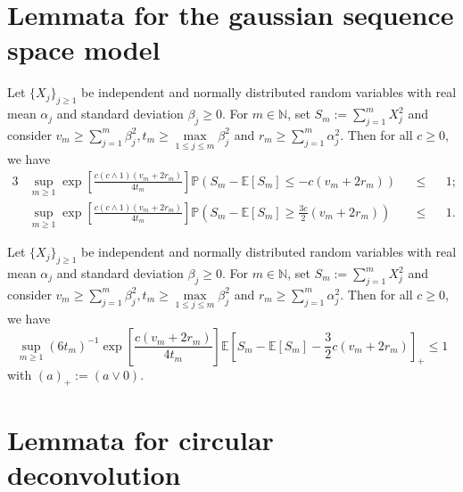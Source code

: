 \section{Lemmata for the gaussian sequence space model}

\begin{lm}\label{lmA.1.1}
Let $\{X_{j}\}_{j \geq 1}$ be independent and normally distributed random variables with real mean $\alpha_{j}$ and standard deviation $\beta_{j} \geq 0$. For $m \in \mathds{N}$, set $S_{m} := \sum \limits_{j = 1}^{m} X_{j}^{2}$ and consider $v_{m} \geq \sum\limits_{j = 1}^{m} \beta_{j}^{2}, t_{m} \geq \max \limits_{1 \leq j \leq m} \beta_{j}^{2}$ and $r_{m} \geq \sum\limits_{j = 1}^{m} \alpha_{j}^{2}$.
Then for all $c \geq 0$, we have
\begin{alignat*}{3}
&\sup\limits_{m \geq 1} \exp\left[\frac{c (c \wedge 1) (v_{m} + 2 r_{m})}{4 t_{m}}\right]\mathds{P}\left(S_{m} - \mathds{E}[S_{m}] \leq - c (v_{m} + 2 r_{m})\right) &&\leq&& 1; \\
&\sup\limits_{m \geq 1} \exp\left[\frac{c (c \wedge 1) (v_{m} + 2 r_{m})}{4 t_{m}}\right]\mathds{P}\left(S_{m} - \mathds{E}[S_{m}] \geq \frac{3 c}{2} (v_{m} + 2 r_{m})\right) &&\leq&& 1.
\end{alignat*}
\end{lm}

\begin{lm}\label{lmA.1.2}
Let $\{X_{j}\}_{j \geq 1}$ be independent and normally distributed random variables with real mean $\alpha_{j}$ and standard deviation $\beta_{j} \geq 0$. For $m \in \mathds{N}$, set $S_{m} := \sum \limits_{j = 1}^{m} X_{j}^{2}$ and consider $v_{m} \geq \sum\limits_{j = 1}^{m} \beta_{j}^{2}, t_{m} \geq \max \limits_{1 \leq j \leq m} \beta_{j}^{2}$ and $r_{m} \geq \sum\limits_{j = 1}^{m} \alpha_{j}^{2}$.
Then for all $c \geq 0$, we have
\[\sup\limits_{m \geq 1}(6 t_{m})^{-1} \exp\left[\frac{c (v_{m} + 2 r_{m})}{4 t_{m}}\right] \mathds{E}\left[S_{m} - \mathds{E}[S_{m}] - \frac{3}{2} c (v_{m} + 2 r_{m})\right]_{+} \leq 1\]
with $(a)_{+} := (a \vee 0).$
\end{lm}

\section{Lemmata for circular deconvolution}

